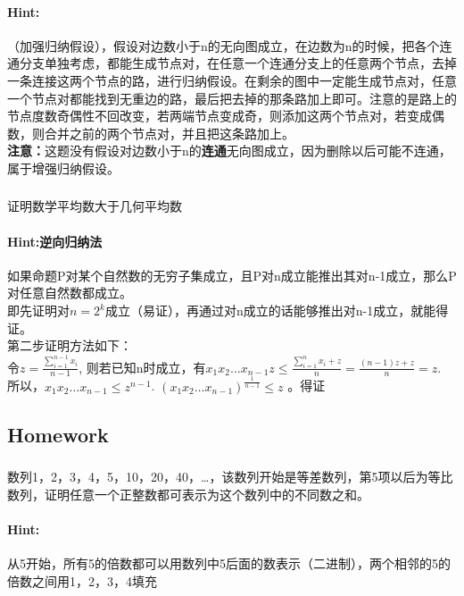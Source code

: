 \documentclass{article}
\begin{document}
     \paragraph{Hint:}（加强归纳假设），假设对边数小于n的无向图成立，在边数为n的时候，把各个连通分支单独考虑，都能生成节点对，在任意一个连通分支上的任意两个节点，去掉一条连接这两个节点的路，进行归纳假设。在剩余的图中一定能生成节点对，任意一个节点对都能找到无重边的路，最后把去掉的那条路加上即可。注意的是路上的节点度数奇偶性不回改变，若两端节点变成奇，则添加这两个节点对，若变成偶数，则合并之前的两个节点对，并且把这条路加上。\\
     \textbf{注意：}这题没有假设对边数小于n的\textbf{连通}无向图成立，因为删除以后可能不连通，属于增强归纳假设。
    
     \subsubsection{}证明数学平均数大于几何平均数
     \paragraph{Hint:逆向归纳法}如果命题P对某个自然数的无穷子集成立，且P对n成立能推出其对n-1成立，那么P对任意自然数都成立。\\
     即先证明对$n = 2^{k}$成立（易证），再通过对n成立的话能够推出对n-1成立，就能得证。\\
     第二步证明方法如下：\\
     令$z =\frac{\sum^{n-1}_{i=1}x_{i}}{n-1}$, 则若已知n时成立，有$x_{1}x_{2}\dots x_{n-1}z \leq\frac{\sum^{n}_{i=1}x_{i} + z}{n} = \frac{(n-1)z+z}{n} = z$. 所以，$x_{1}x_{2}\dots x_{n-1} \leq z^{n-1}$. $(x_{1}x_{2}\dots x_{n-1})^{\frac{1}{n-1}
     }\leq z$ 。得证

     
     \subsection{Homework}
     
     \subsubsection{}数列1，2，3，4，5，10，20，40，…，该数列开始是等差数列，第5项以后为等比数列，证明任意一个正整数都可表示为这个数列中的不同数之和。
     \paragraph{Hint:}从5开始，所有5的倍数都可以用数列中5后面的数表示（二进制），两个相邻的5的倍数之间用1，2，3，4填充
     
\end{document}
